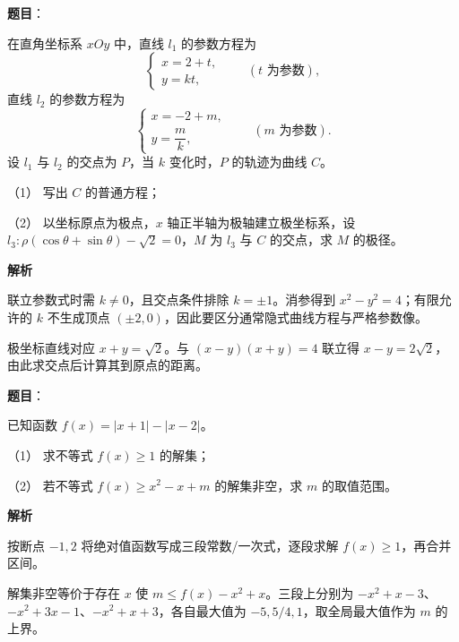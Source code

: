 \begin{answer}

\textbf{题目}：

在直角坐标系 \(xOy\) 中，直线 \(l_1\) 的参数方程为
\nopagebreak[4]
\[
\begin{cases}
x=2+t,\\
y=kt,
\end{cases}\qquad(t\text{ 为参数}),
\]
直线 \(l_2\) 的参数方程为
\nopagebreak[4]
\[
\begin{cases}
x=-2+m,\\
y=\dfrac{m}{k},
\end{cases}\qquad(m\text{ 为参数}).
\]
设 \(l_1\) 与 \(l_2\) 的交点为 \(P\)，当 \(k\) 变化时，\(P\) 的轨迹为曲线 \(C\)。

   （1） 写出 \(C\) 的普通方程；

   （2） 以坐标原点为极点，\(x\) 轴正半轴为极轴建立极坐标系，设 \(l_3:\rho(\cos\theta+\sin\theta)-\sqrt2=0\)，\(M\) 为 \(l_3\) 与 \(C\) 的交点，求 \(M\) 的极径。

\textbf{解析}


联立参数式时需 \(k\ne0\)，且交点条件排除 \(k=\pm1\)。消参得到 \(x^2-y^2=4\)；有限允许的 \(k\) 不生成顶点 \((\pm2,0)\)，因此要区分通常隐式曲线方程与严格参数像。


极坐标直线对应 \(x+y=\sqrt2\)。与 \((x-y)(x+y)=4\) 联立得 \(x-y=2\sqrt2\)，由此求交点后计算其到原点的距离。




\end{answer}
\begin{answer}

\textbf{题目}：

已知函数 \(f(x)=|x+1|-|x-2|\)。

   （1） 求不等式 \(f(x)\ge1\) 的解集；

   （2） 若不等式 \(f(x)\ge x^2-x+m\) 的解集非空，求 \(m\) 的取值范围。

\textbf{解析}


按断点 \(-1,2\) 将绝对值函数写成三段常数/一次式，逐段求解 \(f(x)\ge1\)，再合并区间。


解集非空等价于存在 \(x\) 使 \(m\le f(x)-x^2+x\)。三段上分别为 \(-x^2+x-3\)、\(-x^2+3x-1\)、\(-x^2+x+3\)，各自最大值为 \(-5,5/4,1\)，取全局最大值作为 \(m\) 的上界。

\gkanswer{答案（1）：\([1,+\infty)\)（D）}


\end{answer}